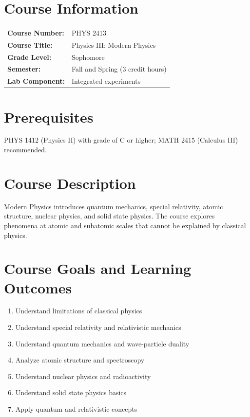 \documentclass[12pt,oneside]{book}
\begin{document}
\section{Course Information}

\begin{tabular}{ll}
\textbf{Course Number:} & PHYS 2413 \\
\textbf{Course Title:} & Physics III: Modern Physics \\
\textbf{Grade Level:} & Sophomore \\
\textbf{Semester:} & Fall and Spring (3 credit hours) \\
\textbf{Lab Component:} & Integrated experiments \\
\end{tabular}

\section{Prerequisites}

PHYS 1412 (Physics II) with grade of C or higher; MATH 2415 (Calculus III) recommended.

\section{Course Description}

Modern Physics introduces quantum mechanics, special relativity, atomic structure, nuclear physics, and solid state physics. The course explores phenomena at atomic and subatomic scales that cannot be explained by classical physics.

\section{Course Goals and Learning Outcomes}

\begin{enumerate}
    \item Understand limitations of classical physics
    \item Understand special relativity and relativistic mechanics
    \item Understand quantum mechanics and wave-particle duality
    \item Analyze atomic structure and spectroscopy
    \item Understand nuclear physics and radioactivity
    \item Understand solid state physics basics
    \item Apply quantum and relativistic concepts
\end{enumerate}
\end{document}
